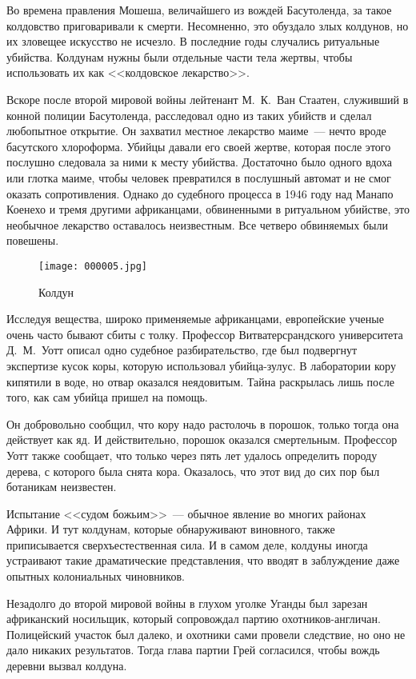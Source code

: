 \documentclass[12pt,a4paper,twoside,openany,svgnames]{memoir}
\begin{document}
Во времена правления Мошеша, величайшего из вождей Басутоленда, за такое колдовство приговаривали к смерти. Несомненно, это обуздало злых колдунов, но их зловещее искусство не исчезло. В последние годы случались ритуальные убийства. Колдунам нужны были отдельные части тела жертвы, чтобы использовать их как <<колдовское лекарство>>.

Вскоре после второй мировой войны лейтенант М.~К.~Ван Стаатен, служивший в конной полиции Басутоленда, расследовал одно из таких убийств и сделал любопытное открытие. Он захватил местное лекарство маиме~--- нечто вроде басутского хлороформа. Убийцы давали его своей жертве, которая после этого послушно следовала за ними к месту убийства. Достаточно было одного вдоха или глотка маиме, чтобы человек превратился в послушный автомат и не смог оказать сопротивления. Однако до судебного процесса в 1946 году над Манапо Коенехо и тремя другими африканцами, обвиненными в ритуальном убийстве, это необычное лекарство оставалось неизвестным. Все четверо обвиняемых были повешены.

\begin{figure}[ht!]
\centering
\texttt{[image: 000005.jpg]}
\caption{Колдун}
\label{overflow}
\end{figure}


Исследуя вещества, широко применяемые африканцами, европейские ученые очень часто бывают сбиты с толку. Профессор Витватерсрандского университета Д.~М.~Уотт описал одно судебное разбирательство, где был подвергнут экспертизе кусок коры, которую использовал убийца-зулус. В лаборатории кору кипятили в воде, но отвар оказался неядовитым. Тайна раскрылась лишь после того, как сам убийца пришел на помощь.

Он добровольно сообщил, что кору надо растолочь в порошок, только тогда она действует как яд. И действительно, порошок оказался смертельным. Профессор Уотт также сообщает, что только через пять лет удалось определить породу дерева, с которого была снята кора. Оказалось, что этот вид до сих пор был ботаникам неизвестен.

Испытание <<судом божьим>>~--- обычное явление во многих районах Африки. И тут колдунам, которые обнаруживают виновного, также приписывается сверхъестественная сила. И в самом деле, колдуны иногда устраивают такие драматические представления, что вводят в заблуждение даже опытных колониальных чиновников.

Незадолго до второй мировой войны в глухом уголке Уганды был зарезан африканский носильщик, который сопровождал партию охотников-англичан. Полицейский участок был далеко, и охотники сами провели следствие, но оно не дало никаких результатов. Тогда глава партии Грей согласился, чтобы вождь деревни вызвал колдуна.
\end{document}
